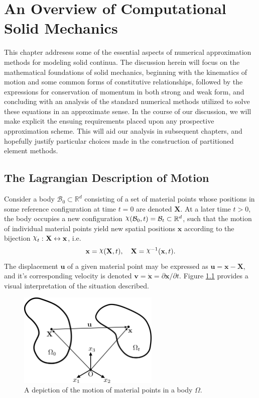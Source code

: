 \chapter{An Overview of Computational Solid Mechanics} \label{ch:solid_mechanics}
%
This chapter addresess some of the essential aspects of numerical approximation methods for modeling solid continua. The discussion herein will focus on the mathematical foundations of solid mechanics, beginning with the kinematics of motion and some common forms of constitutive relationships, followed by the expressions for conservation of momentum in both strong and weak form, and concluding with an analysis of the standard numerical methods utilized to solve these equations in an approximate sense. In the course of our discussion, we will make explicit the ensuing requirements placed upon any prospective approximation scheme. This will aid our analysis in subsequent chapters, and hopefully justify particular choices made in the construction of partitioned element methods.

\newpage

\section{The Lagrangian Description of Motion}

Consider a body $\mathcal{B}_0 \subset \mathbb{R}^d$ consisting of a set of material points whose positions in some reference configuration at time $t = 0$ are denoted $\mathbf{X}$. At a later time $t > 0$, the body occupies a new configuration $\raisebox{\depth}{$\chi$} (\mathcal{B}_0, t) = \mathcal{B}_t \subset \mathbb{R}^d$, such that the motion of individual material points yield new spatial positions $\mathbf{x}$ according to the bijection $\raisebox{\depth}{$\chi$}_t \, \colon \mathbf{X} \leftrightarrow \mathbf{x}$, i.e.
\begin{equation}
  \mathbf{x} = \raisebox{\depth}{$\chi$} (\mathbf{X}, t), \quad \mathbf{X} = \raisebox{\depth}{$\chi$}^{-1} (\mathbf{x}, t).
\end{equation}
The displacement $\mathbf{u}$ of a given material point may be expressed as $\mathbf{u} = \mathbf{x} - \mathbf{X}$, and it's corresponding velocity is denoted $\mathbf{v} = \dot{\mathbf{x}} = \partial \mathbf{x} / \partial t$. Figure \ref{fig:kinematics} provides a visual interpretation of the situation described.
\begin{figure}[!h]
  \centering
  \includegraphics[width=0.6\textwidth]{figures/kinematics.png}
  \caption{A depiction of the motion of material points in a body $\Omega$.}
  \label{fig:kinematics}
\end{figure}

